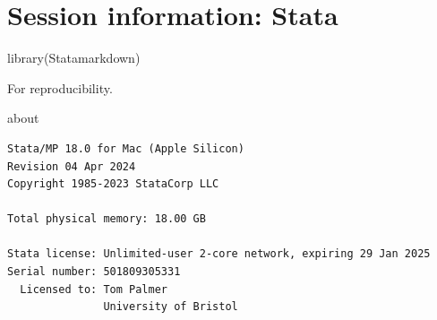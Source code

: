 \documentclass[
  10pt,
  a4paper,
]{book}
\newenvironment{Shaded}{\begin{snugshade}}{\end{snugshade}}
\newcommand{\FunctionTok}[1]{\textcolor[rgb]{0.28,0.35,0.67}{#1}}
\newcommand{\NormalTok}[1]{\textcolor[rgb]{0.00,0.46,0.62}{#1}}
\begin{document}
\chapter*{Session information: Stata}\label{session-information-stata}

\begin{Shaded}
\begin{Highlighting}[]
\FunctionTok{library}\NormalTok{(Statamarkdown)}
\end{Highlighting}
\end{Shaded}

For reproducibility.

\begin{Shaded}
\begin{Highlighting}[]
\NormalTok{about}
\end{Highlighting}
\end{Shaded}

\begin{verbatim}
Stata/MP 18.0 for Mac (Apple Silicon)
Revision 04 Apr 2024
Copyright 1985-2023 StataCorp LLC

Total physical memory: 18.00 GB

Stata license: Unlimited-user 2-core network, expiring 29 Jan 2025
Serial number: 501809305331
  Licensed to: Tom Palmer
               University of Bristol
\end{verbatim}
\end{document}
